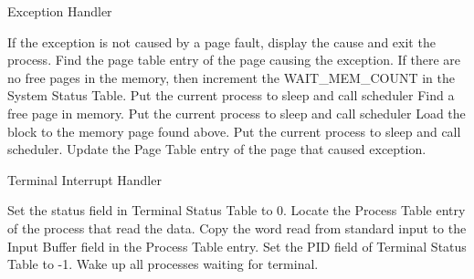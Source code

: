 
\begin{algorithm}
\caption{Exception Handler}
\begin{algorithmic}
\STATE If the exception is not caused by a page fault, display the cause and exit the process.
\STATE Find the page table entry of the page causing the exception.
\STATE If there are no free pages in the memory, then increment the WAIT\_MEM\_COUNT in the System Status Table.
    \STATE Put the current process to sleep and call scheduler
\ENDWHILE
\STATE Find a free page in memory.
        \STATE Put the current process to sleep and call scheduler
    \ENDWHILE
    \STATE Load the block to the memory page found above.
    \STATE Put the current process to sleep and call scheduler.
\ENDIF
\STATE Update the Page Table entry of the page that caused exception. 
\RETURN
\end{algorithmic}
\end{algorithm}


\begin{algorithm}
\caption{Terminal Interrupt Handler}
\begin{algorithmic}
\STATE Set the status field in Terminal Status Table to 0.
\STATE Locate the Process Table entry of the process that read the data.
\STATE Copy the word read from standard input to the Input Buffer field in the Process Table entry.
\STATE Set the PID field of Terminal Status Table to -1.
\STATE Wake up all processes waiting for terminal.
\end{algorithmic}
\end{algorithm}




